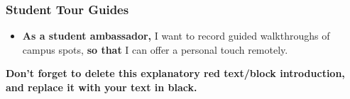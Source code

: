 \begin{tcolorbox}[      %
    boxrule=0pt,        %
    colback=white,      %
    coltext=red         %
]
    \subsubsection*{Student Tour Guides}
    \begin{itemize}
      \item \textbf{As a student ambassador,} I want to record guided walkthroughs of campus spots, \textbf{so that} I can offer a personal touch remotely.
    \end{itemize}
    \vspace{15pt}       %
    \begin{center}      %
    \textbf{Don't forget to delete this explanatory red text/block introduction, and replace it with your text in black.}
    \end{center}        %
\end{tcolorbox}         %